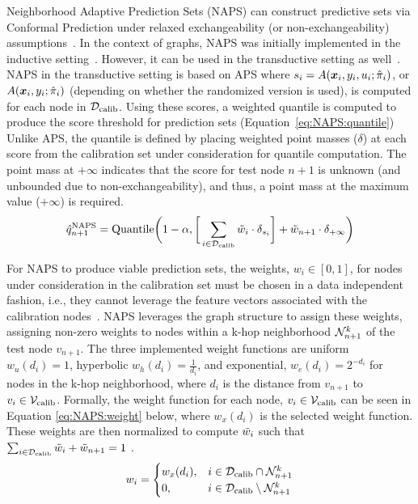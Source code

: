 Neighborhood Adaptive Prediction Sets (NAPS) can construct predictive sets via Conformal Prediction under relaxed exchangeability (or non-exchangeability) assumptions~\cite{barber2023conformal}.
In the context of graphs, NAPS was initially implemented in the inductive setting~\cite{clarkson2023distribution}.
However, it can be used in the transductive setting as well~\cite{zargarbashi23conformal}. 
NAPS in the transductive setting is based on APS where $s_i = A({\bm{x}}_i, y_i, u_i;\hat{\pi}_i)$, or $A({\bm{x}}_i, y_i;\hat{\pi}_i)$ (depending on whether the randomized version is used), is computed for each node in ${\mathcal{D}}_{\text{calib}}$. 
Using these scores, a weighted quantile is computed to produce the score threshold for prediction sets (Equation~\ref{eq:NAPS:quantile})
Unlike APS, the quantile is defined by placing weighted point masses ($\delta$) at each score from the calibration set under consideration for quantile computation.
The point mass at $+\infty$ indicates that the score for test node $n+1$ is unknown (and unbounded due to non-exchangeability), and thus, a point mass at the maximum value ($+\infty$) is required.%
\begin{align}
    \hat{q}^{\text{NAPS}}_{n+1} = \text{Quantile}\bigg(1-\alpha, \bigg[\sum_{i\in{\mathcal{D}}_{\text{calib}}}\Tilde{w}_{i}\cdot \delta_{s_{i}}\bigg] + \Tilde{w}_{n+1}\cdot \delta_{+\infty}\bigg)
    \label{eq:NAPS:quantile}
\end{align}

For NAPS to produce viable prediction sets, the weights, $w_i\in [0,1]$, for nodes under consideration in the calibration set must be chosen in a data independent fashion, i.e., they cannot leverage the feature vectors associated with the calibration nodes~\citep{barber2023conformal}.
NAPS leverages the graph structure to assign these weights, assigning non-zero weights to nodes within a k-hop neighborhood ${\mathcal{N}}_{n+1}^k$ of the test node $v_{n+1}$.
The three implemented weight functions are uniform $w_u(d_i) = 1$, hyperbolic $w_h(d_i) = \frac{1}{d_i}$, and exponential, $w_e(d_i) = 2^{-d_i}$ for nodes in the k-hop neighborhood, where $d_i$ is the distance from $v_{n+1}$ to $v_i \in {\mathcal{V}}_{\text{calib}}$.
Formally, the weight function for each node, $v_i \in {\mathcal{V}}_{\text{calib}}$ can be seen in Equation \ref{eq:NAPS:weight} below, where $w_x(d_i)$ is the selected weight function.
These weights are then normalized to compute $\Tilde{w}_i$ such that $\sum_{i\in{\mathcal{D}}_{\text{calib}}} \Tilde{w}_i + \Tilde{w}_{n+1} = 1$ \cite{barber2023conformal}.
\begin{align}
    w_i = \begin{cases}
w_x(d_i), & i\in {\mathcal{D}}_{\text{calib}}\cap\mathcal{N}_{n+1}^k\\
0,& i\in {\mathcal{D}}_{\text{calib}}\setminus\mathcal{N}_{n+1}^k
\end{cases}
    \label{eq:NAPS:weight}
\end{align}

